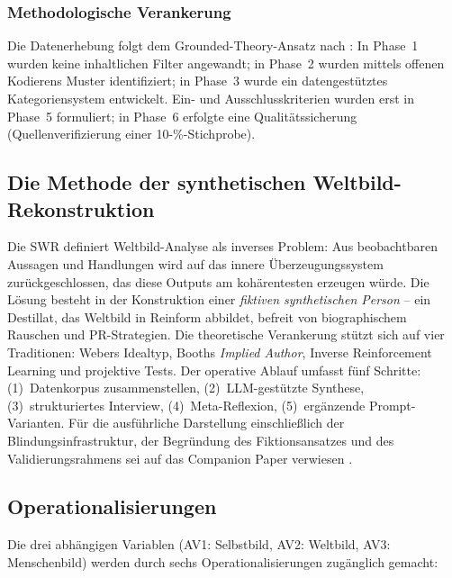 \documentclass[12pt,a4paper]{article}
\begin{document}
\subsubsection{Methodologische Verankerung}

Die Datenerhebung folgt dem Grounded-Theory-Ansatz nach \citet{StraussCorbin1990}: In Phase~1 wurden keine inhaltlichen Filter angewandt; in Phase~2 wurden mittels offenen Kodierens Muster identifiziert; in Phase~3 wurde ein datengest\"utztes Kategoriensystem entwickelt. Ein- und Ausschlusskriterien wurden erst in Phase~5 formuliert; in Phase~6 erfolgte eine Qualit\"atssicherung (Quellenverifizierung einer 10-\%-Stichprobe).


\subsection{Die Methode der synthetischen Weltbild-Rekonstruktion}
\label{sec:methodik:swr}

Die SWR definiert Weltbild-Analyse als inverses Problem: Aus beobachtbaren Aussagen und Handlungen wird auf das innere \"Uberzeugungssystem zur\"uckgeschlossen, das diese Outputs am koh\"arentesten erzeugen w\"urde. Die L\"osung besteht in der Konstruktion einer \emph{fiktiven synthetischen Person} -- ein Destillat, das Weltbild in Reinform abbildet, befreit von biographischem Rauschen und PR-Strategien. Die theoretische Verankerung st\"utzt sich auf vier Traditionen: Webers Idealtyp, Booths \emph{Implied Author}, Inverse Reinforcement Learning und projektive Tests. Der operative Ablauf umfasst f\"unf Schritte: (1)~Datenkorpus zusammenstellen, (2)~LLM-gest\"utzte Synthese, (3)~strukturiertes Interview, (4)~Meta-Reflexion, (5)~erg\"anzende Prompt-Varianten. F\"ur die ausf\"uhrliche Darstellung einschlie\ss{}lich der Blindungsinfrastruktur, der Begr\"undung des Fiktionsansatzes und des Validierungsrahmens sei auf das Companion Paper verwiesen \citep{Geiger2026SWR}.


\subsection{Operationalisierungen}
\label{sec:methodik:ops}

Die drei abh\"angigen Variablen (AV1: Selbstbild, AV2: Weltbild, AV3: Menschenbild) werden durch sechs Operationalisierungen zug\"anglich gemacht:
\end{document}
